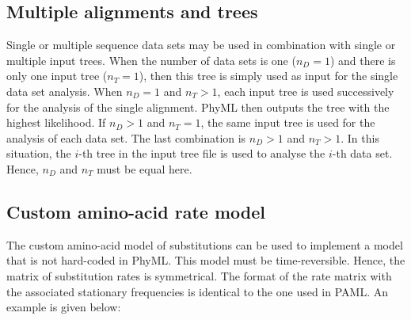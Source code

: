 \documentclass[a4paper,12pt]{article}
\begin{document}
\subsection{Multiple alignments and trees}

Single or  multiple sequence  data sets may  be used  in combination with  single or  multiple input
trees. When the number of data sets is one ($n_D = 1$) and there is only one input tree ($n_T = 1$),
then this tree is simply  used as input for the single data set analysis. When  $n_D = 1$ and $n_T >
1$,  each input tree  is used  successively for  the analysis  of the  single alignment.  PhyML then
outputs the tree  with the highest likelihood.  If $n_D > 1$ and  $n_T = 1$, the same  input tree is
used for the analysis  of each data set.  The last  combination is $n_D > 1$ and $n_T  > 1$. In this
situation, the  $i$-th tree in the input  tree file is used  to analyse the $i$-th  data set. Hence,
$n_D$ and $n_T$ must be equal here.


\subsection{Custom amino-acid rate model}\label{sec:customaa}

The custom amino-acid model of substitutions can be used to implement a model that is not hard-coded
in  PhyML.   This model  must  be  time-reversible.  Hence,  the  matrix  of  substitution rates  is
symmetrical. The format  of the rate matrix with the associated  stationary frequencies is identical
to the one used in PAML. An example is given below:
\end{document}
